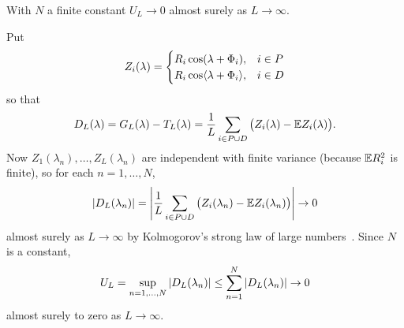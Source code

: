 \documentclass[journal]{IEEEtran}
\begin{document}
\begin{lemma}\label{lem:supDLlambdan}
With $N$ a finite constant $U_L \rightarrow 0$ almost surely as $L \rightarrow \infty$.
\end{lemma}
\begin{IEEEproof}
Put
\[
Z_i(\lambda) = \begin{cases}
R_i\cos(\lambda + \Phi_i) , & i \in P \\
R_i\cos\langle \lambda + \Phi_i \rangle , & i \in D
\end{cases}
\]
so that
\[
D_L(\lambda) = G_L(\lambda) - T_L(\lambda) = \frac{1}{L}\sum_{i\in P \cup D} \big( Z_i(\lambda) - {\mathbb E} Z_i(\lambda) \big).
\]
Now $Z_1(\lambda_n), \dots,Z_L(\lambda_n)$ are independent with finite variance (because ${\mathbb E} R_i^2$ is finite), so for each $n =1, \dots, N$,
\[
{\left\vert D_L(\lambda_n) \right\vert} = {\left\vert \frac{1}{L}\sum_{i\in P \cup D} \big( Z_i(\lambda_n) - {\mathbb E} Z_i(\lambda_n)\big) \right\vert} \rightarrow 0
\]
almost surely as $L\rightarrow\infty$ by Kolmogorov's strong law of large numbers~\cite[Theorem 2.3.10]{SenSinger_large_sample_stats_1993}.  Since $N$ is a constant,
\[
U_L = \sup_{n=1,\dots,N}{\vert D_L(\lambda_n) \vert} \leq \sum_{n=1}^N {\vert D_L(\lambda_n) \vert} \rightarrow 0
\]
almost surely to zero as $L \rightarrow \infty$.
\end{IEEEproof}
\end{document}
